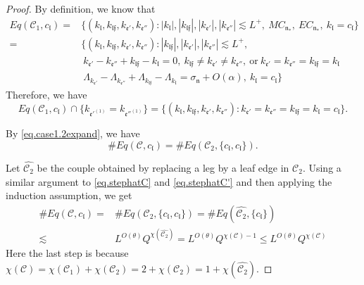 \begin{proof}
By definition, we know that  
\begin{equation}
\begin{split}
    Eq(\mathcal{C}_1,c_{\mathfrak{l}})=&\{(k_{\mathfrak{l}}, k_{\mathfrak{l}\mathfrak{f}}, k_{\mathfrak{e}'}, k_{\mathfrak{e}''}):  |k_{\mathfrak{l}}|, |k_{\mathfrak{l}\mathfrak{f}}|, |k_{\mathfrak{e}'}|, |k_{\mathfrak{e}''}| \lesssim L^+,\ MC_{\mathfrak{n}_*},\  EC_{\mathfrak{n}_*},\ k_{\mathfrak{l}}=c_{\mathfrak{l}}\}
    \\
    =&\{(k_{\mathfrak{l}}, k_{\mathfrak{l}\mathfrak{f}}, k_{\mathfrak{e}'}, k_{\mathfrak{e}''}):   |k_{\mathfrak{l}\mathfrak{f}}|, |k_{\mathfrak{e}'}|, |k_{\mathfrak{e}''}| \lesssim L^+,
    \\
    &\ k_{\mathfrak{e}'}-k_{\mathfrak{e}''}+k_{\mathfrak{l}\mathfrak{f}}-k_{\mathfrak{l}}=0,\ k_{\mathfrak{l}\mathfrak{f}}\ne k_{\mathfrak{e}'}\ne k_{\mathfrak{e}''},\ \text{or}\ k_{\mathfrak{e}'}= k_{\mathfrak{e}''}=k_{\mathfrak{l}\mathfrak{f}}=k_{\mathfrak{l}}
    \\
    &\  \Lambda_{k_{\mathfrak{e}'}}-\Lambda_{k_{\mathfrak{e}''}}+\Lambda_{k_{\mathfrak{l}\mathfrak{f}}}-\Lambda_{k_{\mathfrak{l}}} =\sigma_{\mathfrak{n}}+O(\alpha),\ k_{\mathfrak{l}}=c_{\mathfrak{l}}\}
\end{split}
\end{equation}
Therefore, we have
\begin{equation}
    Eq(\mathcal{C}_1,c_{\mathfrak{l}})\cap \{k_{\mathfrak{e}'^{(1)}}=k_{\mathfrak{e}''^{(1)}}\}=\{(k_{\mathfrak{l}}, k_{\mathfrak{l}\mathfrak{f}}, k_{\mathfrak{e}'}, k_{\mathfrak{e}''}):k_{\mathfrak{e}'}=k_{\mathfrak{e}''}=k_{\mathfrak{l}\mathfrak{f}}=k_{\mathfrak{l}}=c_{\mathfrak{l}}\}.
\end{equation}

By \eqref{eq.case1.2expand}, we have
\begin{equation}
    \#Eq(\mathcal{C},c_{\mathfrak{l}})=\#Eq(\mathcal{C}_{2}, \{c_{\mathfrak{l}}, c_{\mathfrak{l}}\}).
\end{equation}

Let $\widehat{\mathcal{C}_2}$ be the couple obtained by replacing a leg by a leaf edge in $\mathcal{C}_{2}$. Using a similar argument to \eqref{eq.stephatC} and \eqref{eq.stephatC'} and then applying the induction assumption, we get
\begin{equation}\label{eq.case1.2expand'}
\begin{split}
    \#Eq(\mathcal{C},c_{\mathfrak{l}})=&\#Eq(\mathcal{C}_{2}, \{c_{\mathfrak{l}}, c_{\mathfrak{l}}\})=\#Eq(\widehat{\mathcal{C}_{2}}, \{c_{\mathfrak{l}}\})
    \\
    \lesssim& L^{O(\theta)} Q^{\chi(\widehat{\mathcal{C}_{2}})}=L^{O(\theta)} Q^{\chi(\mathcal{C})-1}\le L^{O(\theta)} Q^{\chi(\mathcal{C})}
\end{split}
\end{equation}
Here the last step is because $\chi(\mathcal{C})=\chi(\mathcal{C}_1)+\chi(\mathcal{C}_2)=2+\chi(\mathcal{C}_2)=1+\chi(\widehat{\mathcal{C}_{2}})$.


\end{proof}
